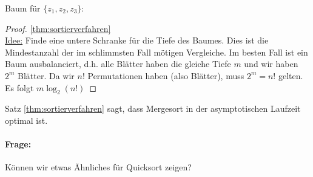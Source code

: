 \begin{example}
Baum für $\{z_1,z_2,z_3\}$: \\
\end{example}
\begin{proof}
\ref{thm:sortierverfahren} \\
\underline{Idee:} Finde eine untere Schranke für die Tiefe des Baumes. Dies ist die Mindestanzahl der im schlimmsten Fall mötigen Vergleiche.
Im besten Fall ist ein Baum ausbalanciert, d.h. alle Blätter haben die gleiche Tiefe $m$ und wir haben $2^{m}$ Blätter. Da wir $n!$ Permutationen haben (also Blätter), muss $2^{m}=n!$ gelten. Es folgt $m \log_2(n!)$
\end{proof}
Satz \ref{thm:sortierverfahren} sagt, dass Mergesort in der asymptotischen Laufzeit optimal ist. 
\paragraph{Frage:} Können wir etwas Ähnliches für Quicksort zeigen?

